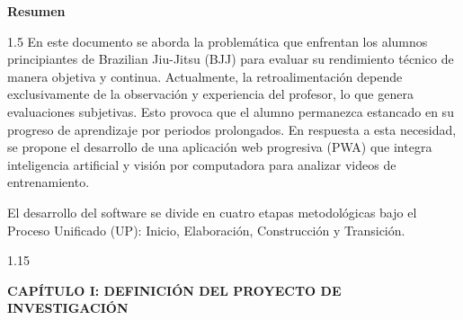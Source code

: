 \documentclass[12pt,letterpaper]{article}
\begin{document}
\clearpage

\thispagestyle{empty}
\begin{center}
    {\bfseries\large Resumen \par}
\end{center}

\vspace{0.8cm}

\begin{spacing}{1.5}
\noindent En este documento se aborda la problemática que enfrentan los alumnos principiantes de Brazilian Jiu-Jitsu (BJJ) para evaluar su rendimiento técnico de manera objetiva y continua. Actualmente, la retroalimentación depende exclusivamente de la observación y experiencia del profesor, lo que genera evaluaciones subjetivas. Esto provoca que el alumno permanezca estancado en su progreso de aprendizaje por periodos prolongados. En respuesta a esta necesidad, se propone el desarrollo de una aplicación web progresiva (PWA) que integra inteligencia artificial y visión por computadora para analizar videos de entrenamiento.

\vspace{0.4cm}

\noindent El desarrollo del software se divide en cuatro etapas metodológicas bajo el Proceso Unificado (UP): Inicio, Elaboración, Construcción y Transición.
\end{spacing}

\clearpage

\thispagestyle{empty}
\begin{spacing}{1.15}
\tableofcontents
\end{spacing}

\clearpage
{}
\setcounter{page}{1}

\renewcommand{\thesection}{1.\arabic{section}}
\renewcommand{\thesubsection}{1.\arabic{section}.\arabic{subsection}}
\setcounter{section}{0}

\begin{center}
    {\bfseries\Large CAPÍTULO I: DEFINICIÓN DEL PROYECTO DE INVESTIGACIÓN \par}
\end{center}
\vspace{1cm}
\end{document}
